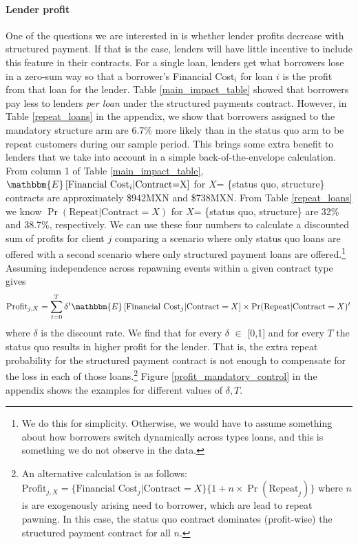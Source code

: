 \documentclass[12pt, a4paper, colorinlistoftodos]{article}
\begin{document}

\paragraph{Lender profit} One of the questions we are interested in is whether lender profits decrease with structured payment. If that is the case, lenders will have little incentive to include this feature in their contracts. For a single loan, lenders get what borrowers lose in a zero-sum way so that a borrower's Financial Cost$_i$ for loan $i$ is the profit from that loan for the lender. Table \ref{main_impact_table} showed that borrowers pay less to lenders \emph{per loan} under the structured payments contract. However, in Table \ref{repeat_loans} in the appendix, we show that borrowers assigned to the mandatory structure arm are 6.7\% more likely than in the status quo arm to be repeat customers during our sample period. This brings some extra benefit to lenders that we take into account in a simple back-of-the-envelope calculation. From column 1 of Table \ref{main_impact_table}, $\mathbbm{E}\left[\text{Financial Cost}_i | \text{Contract=X}\right]$ for $X$= \{status quo, structure\} contracts are approximately \$942MXN and \$738MXN. From Table \ref{repeat_loans} we know $\Pr(\text{Repeat} | \text{Contract}=X)$ for $X$= \{status quo, structure\} are 32\% and 38.7\%, respectively. We can use these four numbers to calculate a discounted sum of profits for client $j$ comparing a scenario where only status quo loans are offered with a second scenario where only structured payment loans are offered.\footnote{We do this for simplicity. Otherwise, we would have to assume something about how borrowers switch dynamically across types loans, and this is something we do not observe in the data.}  
Assuming independence across repawning events within a given contract type gives  
\[
\text{Profit}_{j,X}  = \sum_{t=0}^T\delta^t\mathbbm{E}\left[\text{Financial Cost}_j | \text{Contract}=X\right]\times\Pr(\text{Repeat} | \text{Contract}=X)^t
\] 
where $\delta$ is the discount rate.  We find that for every  $\delta$ $\in$ [0,1]    and for every $T$ the status quo results in higher profit for the lender. That is, the extra repeat probability for the structured payment contract is not enough to compensate for the loss in each of those loans.\footnote{An alternative calculation is as follows: $\text{Profit}_{j,X} = \{\text{Financial Cost}_j | \text{Contract}=X\}\{1+n\times\Pr(\text{Repeat}_j)\}$ where $n$ is are exogenously arising need to borrower, which are lead to repeat pawning. In this case, the status quo contract dominates (profit-wise) the structured payment contract for all $n$.} Figure \ref{profit_mandatory_control} in the appendix shows the examples for different values of $\delta, T$.
\end{document}
